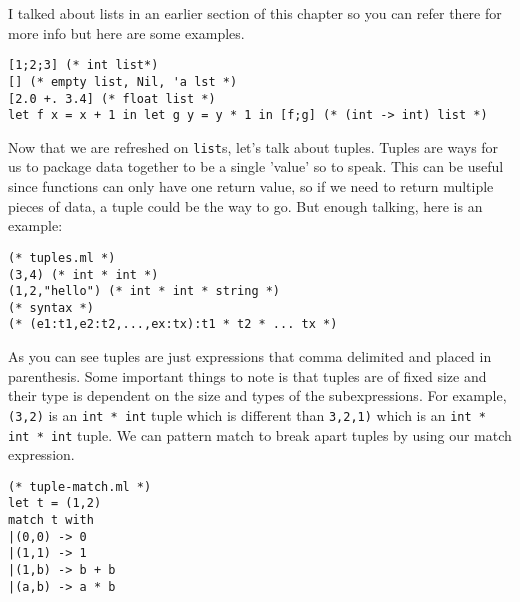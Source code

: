 \documentclass[main.tex]{subfiles}
\begin{document}
I talked about lists in an earlier section of this chapter so you can refer there for more info but here are some examples.
\begin{lstlisting}[style=Myocamlstyle]
[1;2;3] (* int list*)
[] (* empty list, Nil, 'a lst *)
[2.0 +. 3.4] (* float list *)
let f x = x + 1 in let g y = y * 1 in [f;g] (* (int -> int) list *)
\end{lstlisting}

Now that we are refreshed on \texttt{list}s, let's talk about tuples. Tuples are ways for us to package data together to be a single 'value' so to speak. This can be useful since functions can only have one return value, so if we need to return multiple pieces of data, a tuple could be the way to go. But enough talking, here is an example:
\begin{lstlisting}[style=Myocamlstyle]
(* tuples.ml *)
(3,4) (* int * int *)
(1,2,"hello") (* int * int * string *)
(* syntax *)
(* (e1:t1,e2:t2,...,ex:tx):t1 * t2 * ... tx *)
\end{lstlisting}
As you can see tuples are just expressions that comma delimited and placed in parenthesis. Some important things to note is that tuples are of fixed size and their type is dependent on the size and types of the subexpressions. For example, \texttt{(3,2)} is an \texttt{int * int} tuple which is different than \texttt{3,2,1)} which is an \texttt{int * int * int} tuple. We can pattern match to break apart tuples by using our match expression. 
\begin{lstlisting}[style=Myocamlstyle]
(* tuple-match.ml *)
let t = (1,2)
match t with 
|(0,0) -> 0
|(1,1) -> 1
|(1,b) -> b + b
|(a,b) -> a * b
\end{lstlisting}
\end{document}
